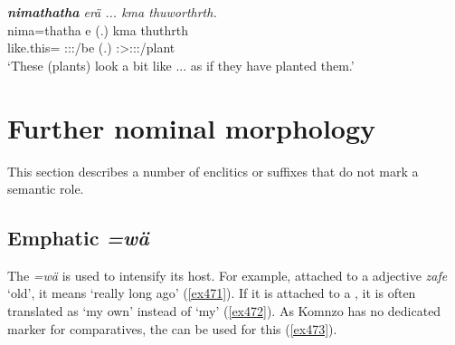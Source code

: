 \begin{exe}
	\ex \emph{\textbf{nimathatha} erä ... kma thuworthrth.}\\
	\gll nima=thatha e (.) kma thuthrth\\
	{like.this}=\Simil{} \Stpl:\Sbj:\Nonpast:\Ipfv/be (.) \Pot{} \Stpl:\Sbj>\Stpl:\Obj:\Rpst:\Ipfv/plant\\ 
	\trans `These (plants) look a bit like ... as if they have planted them.'\\
	\label{ex416}
\end{exe}

\section{Further nominal morphology}\label{furthernommorph}

This section describes a number of  enclitics or suffixes that do not mark a semantic role.

\subsection{Emphatic \emph{=wä}} \label{emphathicwae}

The   \emph{=wä} is used to intensify its host. For example, attached to a  adjective \emph{zafe} `old', it means `really long ago' (\ref{ex471}). If it is attached to a  , it is often translated as `my own' instead of `my' (\ref{ex472}). As Komnzo has no dedicated marker for comparatives, the   can be used for this (\ref{ex473}). 

